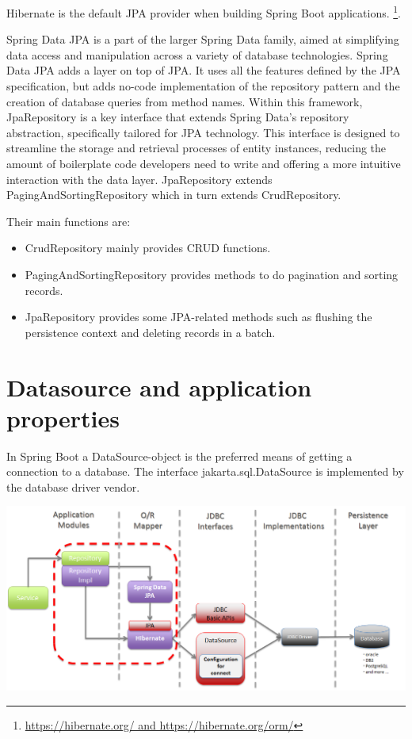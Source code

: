 Hibernate is the default JPA provider when building Spring Boot applications. \footnote{\url{https://hibernate.org/ and https://hibernate.org/orm/}}.  

Spring Data JPA is a part of the larger Spring Data family, aimed at simplifying data access and manipulation across a variety of database technologies.
Spring Data JPA adds a layer on top of JPA. It uses all the features defined by the JPA specification, but adds no-code implementation of the repository pattern and the creation of database queries from method names.
Within this framework, JpaRepository is a key interface that extends Spring Data’s repository abstraction, specifically tailored for JPA technology. This interface is designed to streamline the storage and retrieval processes of entity instances, reducing the amount of boilerplate code developers need to write and offering a more intuitive interaction with the data layer.
JpaRepository extends PagingAndSortingRepository which in turn extends CrudRepository.

Their main functions are:

\begin{itemize}
\item CrudRepository mainly provides CRUD functions.
\item PagingAndSortingRepository provides methods to do pagination and sorting records.
\item JpaRepository provides some JPA-related methods such as flushing the persistence context and deleting records in a batch.
\end{itemize}


\section{Datasource and application properties}

In Spring Boot a DataSource-object is the preferred means of getting a connection to a database.
The interface jakarta.sql.DataSource is implemented by the database driver vendor. 

\includegraphics[width=\textwidth]{./images/chapter-jpa/springdatajpa}

